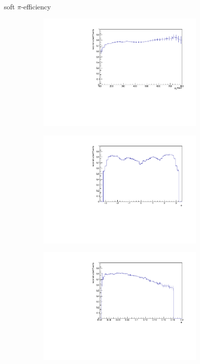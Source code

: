 \documentclass[11pt]{beamer}
\begin{document}
\begin{frame}{soft $\pi$-efficiency}
\begin{figure}
\begin{subfigure}{0.45\textwidth}
\includegraphics[width=0.9\textwidth]{up_pdf/neg/h_pt_reco_SPi_neg.pdf}
\end{subfigure}
\begin{subfigure}{0.45\textwidth}
\includegraphics[width=0.9\textwidth]{up_pdf/neg/h_phi_reco_SPi_neg.pdf}
\end{subfigure}
\begin{subfigure}{0.45\textwidth}
\includegraphics[width=0.9\textwidth]{up_pdf/neg/h_theta_reco_SPi_neg.pdf}

\end{subfigure}
\end{figure}
\end{frame}
\end{document}
